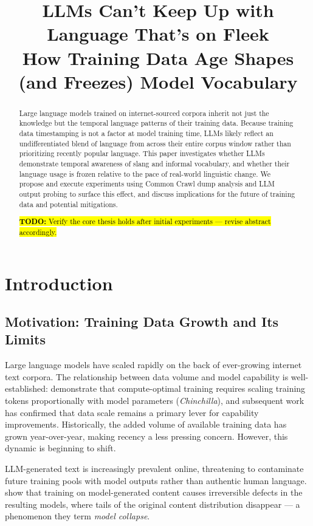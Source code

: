 \documentclass[11pt]{article}
\title{LLMs Can't Keep Up with Language That's on Fleek\\
{\large How Training Data Age Shapes (and Freezes) Model Vocabulary}}
\newcommand{\todo}[1]{\hl{\textbf{TODO:} #1}}
\begin{document}
\maketitle

\begin{abstract}
Large language models trained on internet-sourced corpora inherit not just the knowledge but the temporal language patterns of their training data. Because training data timestamping is not a factor at model training time, LLMs likely reflect an undifferentiated blend of language from across their entire corpus window rather than prioritizing recently popular language. This paper investigates whether LLMs demonstrate temporal awareness of slang and informal vocabulary, and whether their language usage is frozen relative to the pace of real-world linguistic change. We propose and execute
experiments using Common Crawl dump analysis and LLM output probing to surface this effect, and discuss implications for the future of training data and potential mitigations.

\todo{Verify the core thesis holds after initial experiments --- revise abstract accordingly.}
\end{abstract}

\section{Introduction}

\subsection{Motivation: Training Data Growth and Its Limits}

Large language models have scaled rapidly on the back of ever-growing
internet text corpora. The relationship between data volume and model
capability is well-established: \citet{hoffmann2022chinchilla}
demonstrate that compute-optimal training requires scaling training
tokens proportionally with model parameters (\textit{Chinchilla}), and
subsequent work has confirmed that data scale remains a primary lever
for capability improvements. Historically, the added volume of available
training data has grown year-over-year, making recency a less pressing
concern. However, this dynamic is beginning to shift.

LLM-generated text is increasingly prevalent online, threatening
  to contaminate future training pools with model outputs rather than
  authentic human language. \citet{shumailov2023curse} show that
  training on model-generated content causes irreversible defects in the
  resulting models, where tails of the original content distribution
  disappear --- a phenomenon they term \textit{model collapse}.
\end{document}
